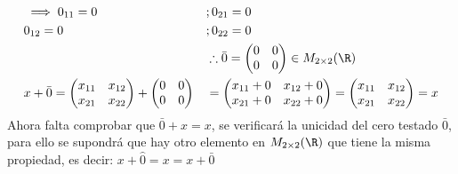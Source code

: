 \begin{exercise}
\begin{align*}
		 & \implies 0_{11}=0               &  & ;0_{21}=0                                                                      \\
		 & 0_{12}=0                        &  & ; 0_{22}=0                                                                     \\
		 &                                 &  & \therefore \bar{0}=\begin{pmatrix}
			                                                           0 & 0 \\0&0
		                                                           \end{pmatrix}\in M_{2\times 2}(\R)                          \\
		 & x+\bar{0}=\begin{pmatrix}
			             x_{11} & x_{12} \\x_{21}&x_{22}
		             \end{pmatrix}+\begin{pmatrix}
			                           0 & 0 \\0&0
		                           \end{pmatrix} &  & =\begin{pmatrix}
			                                               x_{11}+0 & x_{12}+0 \\x_{21}+0&x_{22}+0
		                                               \end{pmatrix}=\begin{pmatrix}
			                                                             x_{11} & x_{12} \\x_{21}&x_{22}
		                                                             \end{pmatrix}=x
	\end{align*}
	Ahora falta comprobar que $\bar{0}+x=x$, se verificará la unicidad del cero testado $\bar{0}$, para ello se supondrá que hay otro elemento en $M_{2\times 2}(\R)$ que tiene la misma propiedad, es decir: $x+\hat{0}=x=x+\bar{0}$


\end{exercise}
